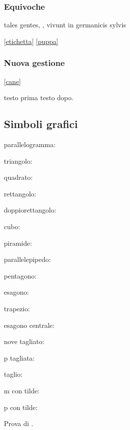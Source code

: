 \documentclass[12pt]{book}
\begin{document}
\subsubsection{Equivoche}
\par
tales gentes, , vivunt in germanicis sylvis
\par
\par
\ref{etichetta}
\ref{puppa}
\subsubsection{Nuova gestione}
\ref{cane}
\par
testo prima  testo dopo.
\subsection{Simboli grafici}
\par
\par parallelogramma:  \PRL
\par triangolo:        \TRN
\par quadrato:         \QDR
\par rettangolo:       \RTT
\par doppiorettangolo: \DRTT
\par cubo:             \CUB
\par piramide:         \PYR
\par parallelepipedo:  \PPD
\par pentagono:        \PEN
\par esagono:          \HEX
\par trapezio:         \TRP
\par esagono centrale: \HEXC
\par nove tagliato:    \CON
\par p tagliata:       \PER
\par
\par taglio:           
\par m con tilde:      \mtilde
\par p con tilde:      \ptilde
\par Prova di .
\par
\htmlcut
\par
\end{document}
